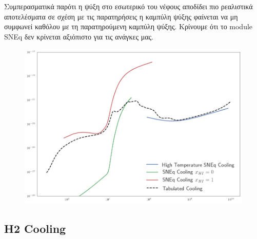Συμπερασματικά παρότι η ψύξη στο εσωτερικό του νέφους αποδίδει πιο ρεαλιστικά αποτελέσματα σε σχέση με τις παρατηρήσεις η καμπύλη ψύξης φαίνεται να μη συμφωνεί καθόλου με τη παρατηρούμενη καμπύλη ψύξης. Κρίνουμε ότι το module SNEq δεν κρίνεται αξιόπιστο για τις ανάγκες μας. 
\begin{figure}
	\centering
	\includegraphics[width=1\linewidth]{DataImages/SNEQcooling-function}
	\caption{}
	\label{fig:sneqcooling-function}
\end{figure}



%	



\newpage
	\subsection{H2 Cooling}
	
